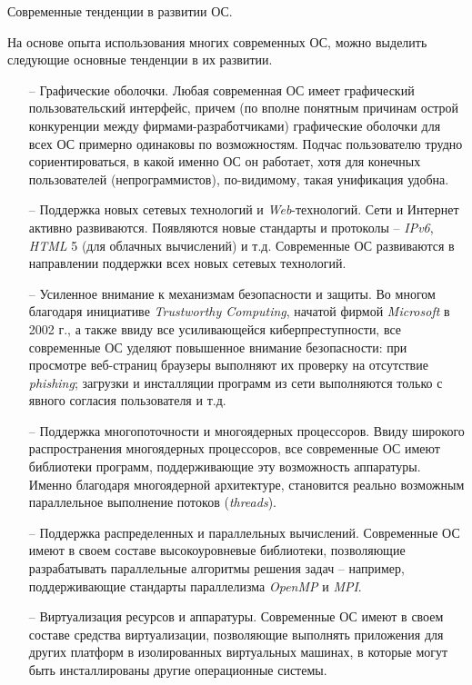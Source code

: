 Современные тенденции в развитии ОС.

На основе опыта использования многих современных ОС, можно выделить следующие основные тенденции в их развитии.
\begin{itemize}
	
	\item[--] Графические оболочки. Любая современная ОС имеет графический пользовательский интерфейс, причем (по вполне понятным причинам острой конкуренции между фирмами-разработчиками) графические оболочки для всех ОС примерно одинаковы по возможностям. Подчас пользователю трудно сориентироваться, в какой именно ОС он работает, хотя для конечных пользователей (непрограммистов), по-видимому, такая унификация удобна.
	
	\item[--] Поддержка новых сетевых технологий и \textit{Web}-технологий. Сети и Интернет активно развиваются. Появляются новые стандарты и протоколы – \textit{IPv6}, \textit{HTML} 5 (для облачных вычислений) и т.д. Современные ОС развиваются в направлении поддержки всех новых сетевых технологий.
	
	\item[--] Усиленное внимание к механизмам безопасности и защиты. Во многом благодаря инициативе \textit{Trustworthy Computing}, начатой фирмой \textit{Microsoft} в 2002 г., а также ввиду все усиливающейся киберпреступности, все современные ОС уделяют повышенное внимание безопасности: при просмотре веб-страниц браузеры выполняют их проверку на отсутствие \textit{phishing}; загрузки и инсталляции программ из сети выполняются только с явного согласия пользователя и т.д.
	
	\item[--] Поддержка многопоточности и многоядерных процессоров. Ввиду широкого распространения многоядерных процессоров, все современные ОС имеют библиотеки программ, поддерживающие эту возможность аппаратуры. Именно благодаря многоядерной архитектуре, становится реально возможным параллельное выполнение потоков (\textit{threads}).
	
	\item[--] Поддержка распределенных и параллельных вычислений. Современные ОС имеют в своем составе высокоуровневые библиотеки, позволяющие разрабатывать параллельные алгоритмы решения задач – например, поддерживающие стандарты параллелизма \textit{OpenMP} и \textit{MPI}.
	
	\item[--] Виртуализация ресурсов и аппаратуры. Современные ОС имеют в своем составе средства виртуализации, позволяющие выполнять приложения для других платформ в изолированных виртуальных машинах, в которые могут быть инсталлированы другие операционные системы.
	

\end{itemize}
